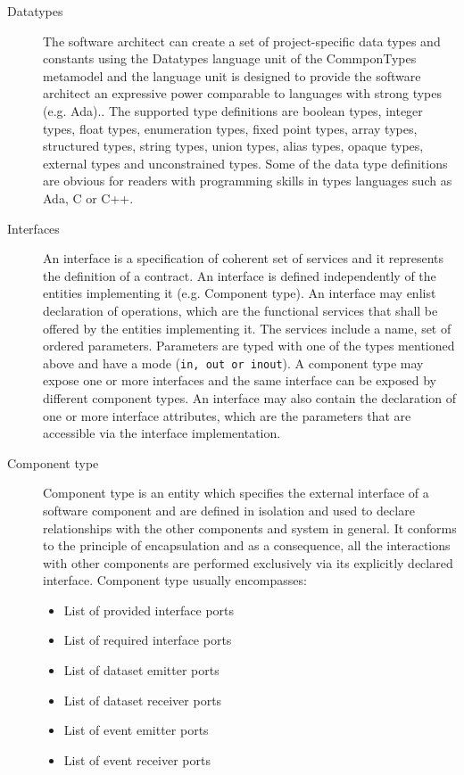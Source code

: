 \begin{description}
\item [Datatypes] The software architect can create a set of project-specific data types and constants using the Datatypes language unit of the CommponTypes metamodel and the language unit is designed to provide the software architect an expressive power comparable to languages with strong types (e.g. Ada).\cite{SpecMetamodel}. The supported type definitions are boolean types, integer types, float types, enumeration types, fixed point types, array types, structured types, string types, union types, alias types, opaque types, external types and unconstrained types. Some of the data type definitions are obvious for readers with programming skills in types languages such as Ada, C or C++. 

\item [Interfaces] An interface is a specification of coherent set of services and it represents the definition of a contract. An interface is defined independently of the entities implementing it (e.g. Component type). An interface may enlist declaration of operations, which are the functional services that shall be offered by the entities implementing it. The services include a name, set of ordered parameters. Parameters are typed with one of the types mentioned above and have a mode (\texttt{in, out or inout}). A component type may expose one or more interfaces and the same interface can be exposed by different component types. An interface may also contain the declaration of one or more interface attributes, which are the parameters that are accessible via the interface implementation.

\item [Component type] Component type is an entity which specifies the external interface of a software component and are defined in isolation and used to declare relationships with the other components and system in general. It conforms to the principle of encapsulation and as a consequence, all the interactions with other components are performed exclusively via its explicitly declared interface. Component type usually encompasses:
\begin{itemize}
\item List of provided interface ports
\item List of required interface ports
\item List of dataset emitter ports 
\item List of dataset receiver ports
\item List of event emitter ports
\item List of event receiver ports 
\end{itemize}


\end{description}
